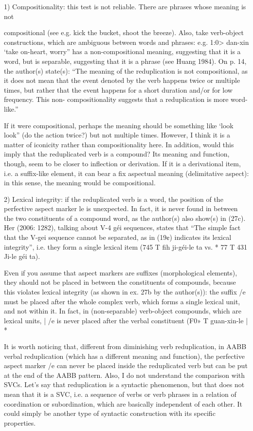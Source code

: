 \documentclass[fleqn,twoside]{article}
\begin{document}
{1) Compositionality: this test is not reliable. There are phrases whose meaning is not

compositional (see e.g. kick the bucket, shoot the breeze). Also, take verb-object constructions,
which are ambiguous between words and phrases: e.g. 1:0> dan-xin ‘take on-heart, worry” has a
non-compositional meaning, suggesting that it is a word, but is separable, suggesting that it is a
phrase (see Huang 1984). On p. 14, the author(s) state(s): “The meaning of the reduplication is not
compositional, as it does not mean that the event denoted by the verb happens twice or multiple
times, but rather that the event happens for a short duration and/or for low frequency. This non-
compositionality suggests that a reduplication is more word-like.” 

If it were compositional, perhaps the meaning should be something like ‘look look” (do the action twice?) but not multiple times. However, I think it is a matter of iconicity rather than compositionality here. In addition, would this imply that the reduplicated verb is a compound? Its meaning and function, though, seem to be closer to inflection or derivation. If it is a derivational item, i.e. a suffix-like element, it can bear a fix aspectual meaning (delimitative aspect): in this sense, the meaning would be compositional.

2) Lexical integrity: if the reduplicated verb is a word, the position of the perfective aspect
marker le is unexpected. In fact, it is never found in between the two constituents of a compound
word, as the author(s) also show(s) in (27c). Her (2006: 1282), talking about V-4 géi sequences,
states that “The simple fact that the V-gei sequence cannot be separated, as in (19¢) indicates its
lexical integrity”, i.e. they form a single lexical item (745 T fih ji-géi-le ta vs. * 77 T 431 Ji-le géi ta).

Even if you assume that aspect markers are suffixes (morphological elements), they should not be placed in between the constituents of compounds, because this violates lexical integrity (as shown in ex. 27b by the author(s)): the suffix /e must be placed after the whole complex verb, which forms a single lexical unit, and not within it. In fact, in (non-separable) verb-object compounds, which are lexical units, | /e is never placed after the verbal constituent (F0» T guan-xin-le | *%

It is worth noticing that, different from diminishing verb reduplication, in AABB verbal reduplication (which has a different meaning and function), the perfective aspect marker /e can never be placed inside the reduplicated verb but can be put at the end of the AABB pattern. Also, I do not understand the comparison with SVCs. Let’s say that reduplication is a syntactic phenomenon, but that does not mean that it is a SVC, i.e. a sequence of verbs or verb phrases in a relation of coordination or subordination, which are basically independent of each other. It could simply be another type of syntactic construction with its specific properties.

}
\end{document}

